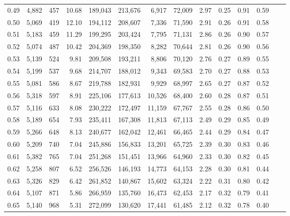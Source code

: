 \begin{tabular}{rrrrrrrrrrrrrr}
0.49 &  4,882 &    457 &    10.68 &  189,043 &  213,676 &   6,917 &  72,009 &  2.97 &  0.25 &  0.91 &      0.59 \\
0.50 &  5,069 &    419 &    12.10 &  194,112 &  208,607 &   7,336 &  71,590 &  2.91 &  0.26 &  0.91 &      0.58 \\
0.51 &  5,183 &    459 &    11.29 &  199,295 &  203,424 &   7,795 &  71,131 &  2.86 &  0.26 &  0.90 &      0.57 \\
0.52 &  5,074 &    487 &    10.42 &  204,369 &  198,350 &   8,282 &  70,644 &  2.81 &  0.26 &  0.90 &      0.56 \\
0.53 &  5,139 &    524 &     9.81 &  209,508 &  193,211 &   8,806 &  70,120 &  2.76 &  0.27 &  0.89 &      0.55 \\
0.54 &  5,199 &    537 &     9.68 &  214,707 &  188,012 &   9,343 &  69,583 &  2.70 &  0.27 &  0.88 &      0.53 \\
0.55 &  5,081 &    586 &     8.67 &  219,788 &  182,931 &   9,929 &  68,997 &  2.65 &  0.27 &  0.87 &      0.52 \\
0.56 &  5,318 &    597 &     8.91 &  225,106 &  177,613 &  10,526 &  68,400 &  2.60 &  0.28 &  0.87 &      0.51 \\
0.57 &  5,116 &    633 &     8.08 &  230,222 &  172,497 &  11,159 &  67,767 &  2.55 &  0.28 &  0.86 &      0.50 \\
0.58 &  5,189 &    654 &     7.93 &  235,411 &  167,308 &  11,813 &  67,113 &  2.49 &  0.29 &  0.85 &      0.49 \\
0.59 &  5,266 &    648 &     8.13 &  240,677 &  162,042 &  12,461 &  66,465 &  2.44 &  0.29 &  0.84 &      0.47 \\
0.60 &  5,209 &    740 &     7.04 &  245,886 &  156,833 &  13,201 &  65,725 &  2.39 &  0.30 &  0.83 &      0.46 \\
0.61 &  5,382 &    765 &     7.04 &  251,268 &  151,451 &  13,966 &  64,960 &  2.33 &  0.30 &  0.82 &      0.45 \\
0.62 &  5,258 &    807 &     6.52 &  256,526 &  146,193 &  14,773 &  64,153 &  2.28 &  0.30 &  0.81 &      0.44 \\
0.63 &  5,326 &    829 &     6.42 &  261,852 &  140,867 &  15,602 &  63,324 &  2.22 &  0.31 &  0.80 &      0.42 \\
0.64 &  5,107 &    871 &     5.86 &  266,959 &  135,760 &  16,473 &  62,453 &  2.17 &  0.32 &  0.79 &      0.41 \\
0.65 &  5,140 &    968 &     5.31 &  272,099 &  130,620 &  17,441 &  61,485 &  2.12 &  0.32 &  0.78 &      0.40 \\

\end{tabular}
